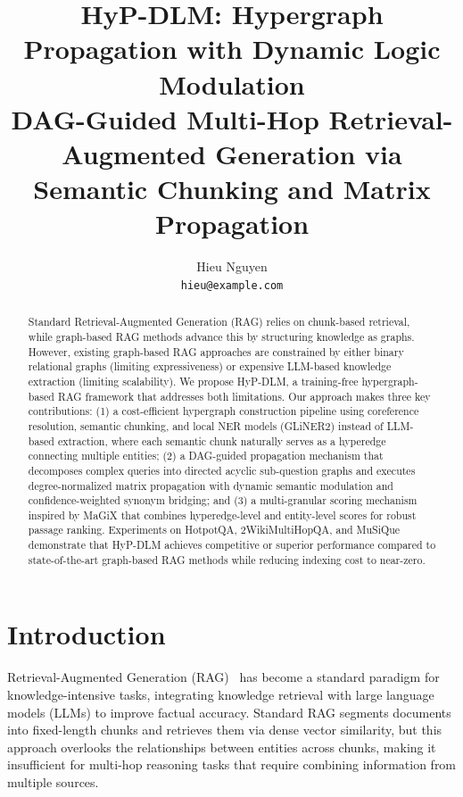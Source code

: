 \documentclass[11pt,a4paper]{article}
\title{HyP-DLM: Hypergraph Propagation with Dynamic Logic Modulation\\
\large DAG-Guided Multi-Hop Retrieval-Augmented Generation via Semantic Chunking and Matrix Propagation}
\author{Hieu Nguyen\\
\texttt{hieu@example.com}}
\date{}
\begin{document}
\maketitle

\begin{abstract}
Standard Retrieval-Augmented Generation (RAG) relies on chunk-based retrieval, while graph-based RAG methods advance this by structuring knowledge as graphs. However, existing graph-based RAG approaches are constrained by either binary relational graphs (limiting expressiveness) or expensive LLM-based knowledge extraction (limiting scalability). We propose HyP-DLM, a training-free hypergraph-based RAG framework that addresses both limitations. Our approach makes three key contributions: (1) a cost-efficient hypergraph construction pipeline using coreference resolution, semantic chunking, and local NER models (GLiNER2) instead of LLM-based extraction, where each semantic chunk naturally serves as a hyperedge connecting multiple entities; (2) a DAG-guided propagation mechanism that decomposes complex queries into directed acyclic sub-question graphs and executes degree-normalized matrix propagation with dynamic semantic modulation and confidence-weighted synonym bridging; and (3) a multi-granular scoring mechanism inspired by MaGiX that combines hyperedge-level and entity-level scores for robust passage ranking. Experiments on HotpotQA, 2WikiMultiHopQA, and MuSiQue demonstrate that HyP-DLM achieves competitive or superior performance compared to state-of-the-art graph-based RAG methods while reducing indexing cost to near-zero.
\end{abstract}

\section{Introduction}

Retrieval-Augmented Generation (RAG)~\cite{lewis2020rag} has become a standard paradigm for knowledge-intensive tasks, integrating knowledge retrieval with large language models (LLMs) to improve factual accuracy. Standard RAG segments documents into fixed-length chunks and retrieves them via dense vector similarity, but this approach overlooks the relationships between entities across chunks, making it insufficient for multi-hop reasoning tasks that require combining information from multiple sources.
\end{document}
